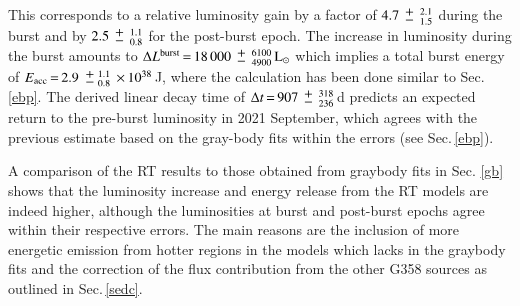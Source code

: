 This corresponds to a relative luminosity gain by a factor of 
$4.7\,{\mypm}\, _{1.5}^{2.1}$ during the burst and by
$2.5\,{\mypm}\, _{0.8}^{1.1}$ for the post-burst epoch.
The increase in luminosity during the burst amounts to  $\Delta L^{\rm burst}\,{=}\,18\,000\,{\mypm}\,_{4900}^{6100}\,{\rm L}_\odot$ which implies a total burst energy of 
$E_{\rm acc}\,{=}\,2.9\mypm_{0.8}^{1.1}\,{\times}\,10^{38}$\,J, where the calculation has been done similar to Sec. \ref{ebp}. 
The derived linear decay time of $\Delta t\,{=}\,907\,{\mypm}\,_{236}^{318}$\,d predicts an expected return to the pre-burst luminosity in 2021 September, which agrees with the previous estimate based on the gray-body fits within the errors (see Sec.\,\ref{ebp}).

A comparison of the RT results to those obtained from graybody fits 
in Sec. \ref{gb} shows that the luminosity increase and energy release from the RT models are indeed higher, although the luminosities at burst and post-burst epochs agree within their respective errors. 
The main reasons
are the inclusion of more energetic emission from hotter regions in the models which lacks in the graybody fits and the correction of the flux contribution from the other G358 sources as outlined in Sec.\,\ref{sedc}.

